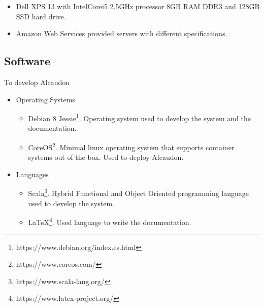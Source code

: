 \begin{itemize}
  \item Dell XPS 13 with Intel\textregistered Core\texttrademark i5 2.5GHz
    processor 8GB RAM DDR3 and 128GB SSD hard drive.
  \item Amazon Web Services provided servers with different specifications.
\end{itemize}

\subsection{Software}

To develop Alcaudon 

\begin{itemize}
  \item Operating Systems
    \begin{itemize}
        \item Debian 8 Jessie\footnote{https://www.debian.org/index.es.html}.
          Operating system used to develop the system and the documentation.
        \item CoreOS\footnote{https://www.coreos.com/}. Minimal linux operating
          system that supports container systems out of the box. Used to deploy
          Alcaudon.
    \end{itemize}

  \item Languages
    \begin{itemize}
      \item Scala\footnote{https://www.scala-lang.org/}. Hybrid Functional and
        Object Oriented programming language used to develop the system.
      \item \LaTeX{}\footnote{https://www.latex-project.org/}. Used language to
        write the documentation.
    \end{itemize}


\end{itemize}
